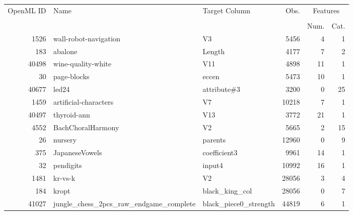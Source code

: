 \begin{table}[h!]
\centering
\begin{tabular}{rllrrr}
\toprule
\multirow{2}{*}{OpenML ID} & \multirow{2}{*}{Name} & \multirow{2}{*}{Target Column} & \multirow{2}{*}{Obs.} & \multicolumn{2}{c}{Features} \\ \cline{5-6}
\\[-0.75em]
&        &                &                            & Num.    & Cat.   \\
\midrule
      1526 &                    wall-robot-navigation &   V3 &      5456 &                4 &                1 \\
       183 &                                abalone &     Length &    4177 &                7 &                2 \\
     40498 &                     wine-quality-white &     V11 &    4898 &               11 &                1 \\
        30 &                            page-blocks &      eccen &   5473 &               10 &                1 \\
     40677 &                                  led24 &      attribute\#3 &   3200 &                0 &               25 \\
      1459 &                  artificial-characters &    V7 &    10218 &                7 &                1 \\
     40497 &                            thyroid-ann &    V13 &     3772 &               21 &                1 \\
      4552 &                      BachChoralHarmony &    V2 &     5665 &                2 &               15 \\
        26 &                                nursery &    parents &    12960 &                0 &                9 \\
       375 &                         JapaneseVowels &     coefficient3 &    9961 &               14 &                1 \\
        32 &                              pendigits &    input4 &    10992 &               16 &                1 \\
      1481 &                                kr-vs-k &     V2 &   28056 &                3 &                4 \\
       184 &                                  kropt &      black\_king\_col &  28056 &                0 &                7 \\
     41027 & jungle\_chess\_2pcs\_raw\_endgame\_complete &    black\_piece0\_strength &    44819 &                6 &                1 \\

\end{tabular}
\end{table}
